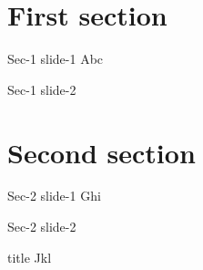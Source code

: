 \section{First section}

\begin{frame}{Sec-1 slide-1}
	Abc
\end{frame}

\begin{frame}{Sec-1 slide-2}
	\citet{R-base}
\end{frame}

\section{Second section}

\begin{frame}{Sec-2 slide-1}
	Ghi
\end{frame}

\begin{frame}{Sec-2 slide-2}
	\begin{block}{title}
		Jkl
	\end{block}
\end{frame}